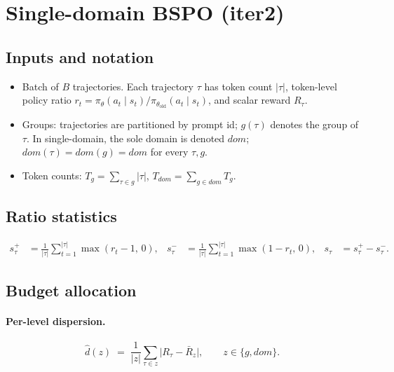\documentclass[11pt]{article}
\begin{document}
\section{Single-domain BSPO (iter2)}

\subsection{Inputs and notation}

\begin{itemize}[noitemsep]
\item Batch of $B$ trajectories. Each trajectory $\tau$ has token count
  $|\tau|$, token-level policy ratio
  $r_t = \pi_\theta(a_t\mid s_t)/\pi_{\theta_{\text{old}}}(a_t\mid s_t)$,
  and scalar reward $R_\tau$.
\item Groups: trajectories are partitioned by prompt id; $g(\tau)$
  denotes the group of $\tau$. In single-domain, the sole domain is
  denoted $dom$; $dom(\tau)=dom(g)=dom$ for every $\tau,g$.
\item Token counts: $T_g = \sum_{\tau\in g}|\tau|$,
  $T_{dom}=\sum_{g\in dom}T_g$.
\end{itemize}

\subsection{Ratio statistics}

\begin{align*}
s_\tau^{+} &= \frac{1}{|\tau|}\sum_{t=1}^{|\tau|}\max(r_t-1,\,0),
& s_\tau^{-} &= \frac{1}{|\tau|}\sum_{t=1}^{|\tau|}\max(1-r_t,\,0),
& s_\tau &= s_\tau^{+} - s_\tau^{-}.
\end{align*}

\subsection{Budget allocation}

\paragraph{Per-level dispersion.}
\[
\hat d(z) \;=\; \frac{1}{|z|}\sum_{\tau\in z}\bigl|R_\tau - \bar R_z\bigr|,
\qquad z\in\{g, dom\}.
\]
\end{document}
